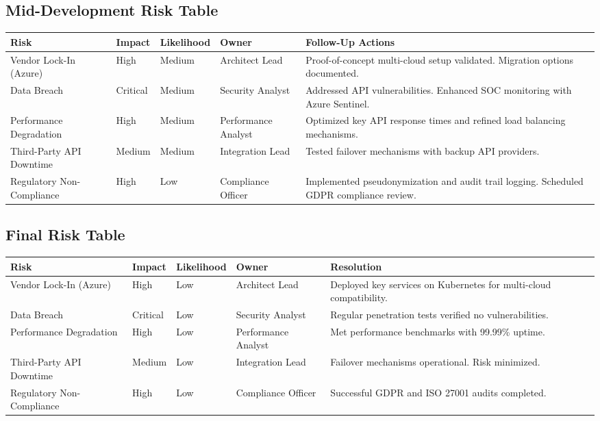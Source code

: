 \documentclass[12pt]{article}
\begin{document}
\subsection{Mid-Development Risk Table}
\begin{longtable}{|p{4cm}|p{3cm}|p{2cm}|p{3cm}|p{4cm}|}
\hline
\textbf{Risk} & \textbf{Impact} & \textbf{Likelihood} & \textbf{Owner} & \textbf{Follow-Up Actions} \\
\hline
Vendor Lock-In (Azure) & High & Medium & Architect Lead & Proof-of-concept multi-cloud setup validated. Migration options documented. \\
\hline
Data Breach & Critical & Medium & Security Analyst & Addressed API vulnerabilities. Enhanced SOC monitoring with Azure Sentinel. \\
\hline
Performance Degradation & High & Medium & Performance Analyst & Optimized key API response times and refined load balancing mechanisms. \\
\hline
Third-Party API Downtime & Medium & Medium & Integration Lead & Tested failover mechanisms with backup API providers. \\
\hline
Regulatory Non-Compliance & High & Low & Compliance Officer & Implemented pseudonymization and audit trail logging. Scheduled GDPR compliance review. \\
\hline
\end{longtable}

\subsection{Final Risk Table}
\begin{longtable}{|p{4cm}|p{3cm}|p{2cm}|p{3cm}|p{4cm}|}
\hline
\textbf{Risk} & \textbf{Impact} & \textbf{Likelihood} & \textbf{Owner} & \textbf{Resolution} \\
\hline
Vendor Lock-In (Azure) & High & Low & Architect Lead & Deployed key services on Kubernetes for multi-cloud compatibility. \\
\hline
Data Breach & Critical & Low & Security Analyst & Regular penetration tests verified no vulnerabilities. \\
\hline
Performance Degradation & High & Low & Performance Analyst & Met performance benchmarks with 99.99\% uptime. \\
\hline
Third-Party API Downtime & Medium & Low & Integration Lead & Failover mechanisms operational. Risk minimized. \\
\hline
Regulatory Non-Compliance & High & Low & Compliance Officer & Successful GDPR and ISO 27001 audits completed. \\
\hline
\end{longtable}
\end{document}

